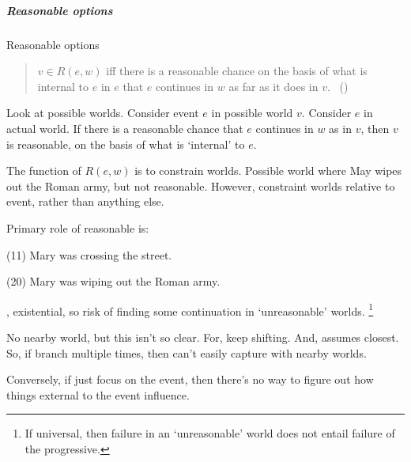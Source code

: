 \subparagraph{Reasonable options}

\begin{note}
  Reasonable options
  \begin{quote}
    \(v \in R(e, w)\) iff there is a reasonable chance on the basis of what is internal to \(e\) in \(e\) that \(e\) continues in \(w\) as far as it does in \(v\).%
    \mbox{ }\hfill\mbox{(\citeyear[26]{Landman:1992wh})}
  \end{quote}

  Look at possible worlds.
  Consider event \(e\) in possible world \(v\).
  Consider \(e\) in actual world.
  If there is a reasonable chance that \(e\) continues in \(w\) as in \(v\), then \(v\) is reasonable, on the basis of what is `internal' to \(e\).

  The function of \(R(e, w)\) is to constrain worlds.
  Possible world where May wipes out the Roman army, but not reasonable.
  However, constraint worlds relative to event, rather than anything else.

  Primary role of reasonable is:

  (11) Mary was crossing the street.

  (20) Mary was wiping out the Roman army.

  \citeauthor{Landman:1992wh}, existential, so risk of finding some continuation in `unreasonable' worlds.%
  \footnote{
    \color{red}
    If universal, then failure in an `unreasonable' world does not entail failure of the progressive.
  }

  No nearby world, but this isn't so clear.
  For, keep shifting.
  And, \citeauthor{Landman:1992wh} assumes closest.
  So, if branch multiple times, then can't easily capture with nearby worlds.

  Conversely, if just focus on the event, then there's no way to figure out how things external to the event influence.
\end{note}

